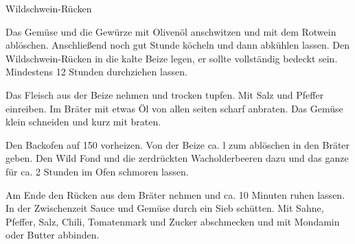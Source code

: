 \begin{recipe}{Wildschwein-Rücken}{}
  \label{Wildschwein-R"ucken}


  \steps
  Das Gemüse und die Gewürze mit Olivenöl anschwitzen und mit dem Rotwein ablöschen.
  Anschließend noch gut \halb Stunde köcheln und dann abkühlen lassen. Den
  Wildschwein-Rücken in die kalte Beize legen, er sollte vollständig bedeckt sein.
  Mindestens 12 Stunden durchziehen lassen.

  Das Fleisch aus der Beize nehmen und trocken tupfen. Mit Salz und Pfeffer einreiben. Im
  Bräter mit etwas Öl von allen seiten scharf anbraten. Das Gemüse klein schneiden und
  kurz mit braten.

  Den Backofen auf 150 \celsius vorheizen. Von der Beize ca. \halb l zum ablöschen in den
  Bräter geben. Den Wild Fond und die zerdrückten Wacholderbeeren dazu und das ganze für
  ca. 2 Stunden im Ofen schmoren lassen.

  Am Ende den Rücken aus dem Bräter nehmen und ca. 10 Minuten ruhen lassen. In der
  Zwischenzeit Sauce und Gemüse durch ein Sieb schütten. Mit Sahne, Pfeffer, Salz, Chili,
  Tomatenmark und Zucker abschmecken und mit Mondamin oder Butter abbinden.
\end{recipe}
